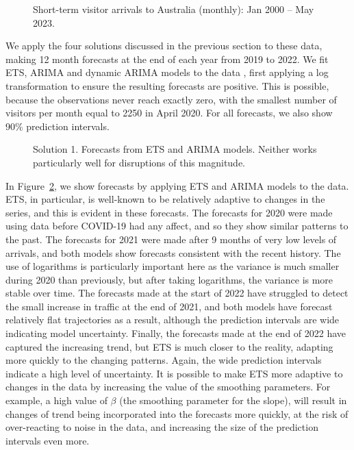 \documentclass[11pt,a4paper,]{article}
\begin{document}
\begin{figure}


\caption{\label{fig-tourism-plot1}Short-term visitor arrivals to
Australia (monthly): Jan 2000 -- May 2023.}

\end{figure}%

We apply the four solutions discussed in the previous section to these
data, making 12 month forecasts at the end of each year from 2019 to
2022. We fit ETS, ARIMA and dynamic ARIMA models to the data
\autocite{fpp3}, first applying a log transformation to ensure the
resulting forecasts are positive. This is possible, because the
observations never reach exactly zero, with the smallest number of
visitors per month equal to 2250 in April 2020. For all forecasts, we
also show 90\% prediction intervals.

\begin{figure}[t]


\caption{\label{fig-tsol1-plot}Solution 1. Forecasts from ETS and ARIMA
models. Neither works particularly well for disruptions of this
magnitude.}

\end{figure}%

In Figure~\ref{fig-tsol1-plot}, we show forecasts by applying ETS and
ARIMA models to the data. ETS, in particular, is well-known to be
relatively adaptive to changes in the series, and this is evident in
these forecasts. The forecasts for 2020 were made using data before
COVID-19 had any affect, and so they show similar patterns to the past.
The forecasts for 2021 were made after 9 months of very low levels of
arrivals, and both models show forecasts consistent with the recent
history. The use of logarithms is particularly important here as the
variance is much smaller during 2020 than previously, but after taking
logarithms, the variance is more stable over time. The forecasts made at
the start of 2022 have struggled to detect the small increase in traffic
at the end of 2021, and both models have forecast relatively flat
trajectories as a result, although the prediction intervals are wide
indicating model uncertainty. Finally, the forecasts made at the end of
2022 have captured the increasing trend, but ETS is much closer to the
reality, adapting more quickly to the changing patterns. Again, the wide
prediction intervals indicate a high level of uncertainty. It is
possible to make ETS more adaptive to changes in the data by increasing
the value of the smoothing parameters. For example, a high value of
\(\beta\) (the smoothing parameter for the slope), will result in
changes of trend being incorporated into the forecasts more quickly, at
the risk of over-reacting to noise in the data, and increasing the size
of the prediction intervals even more.
\end{document}
